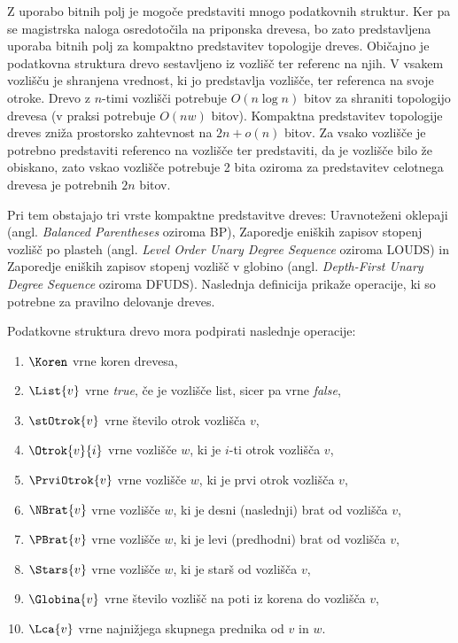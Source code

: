 Z uporabo bitnih polj je mogoče predstaviti mnogo podatkovnih struktur. Ker pa se magistrska naloga osredotočila na priponska drevesa, bo zato predstavljena uporaba bitnih polj za kompaktno predstavitev topologije dreves. Običajno je podatkovna struktura drevo sestavljeno iz vozlišč ter referenc  na njih. V vsakem vozlišču je shranjena vrednost, ki jo predstavlja vozlišče, ter referenca na svoje otroke. Drevo z $n$-timi vozlišči potrebuje $O(n\log{n})$ bitov za shraniti topologijo drevesa (v praksi potrebuje $O(nw)$ bitov). Kompaktna predstavitev topologije dreves zniža prostorsko zahtevnost na $2n+o(n)$ bitov. Za vsako vozlišče je potrebno predstaviti referenco na vozlišče ter predstaviti, da je vozlišče bilo že obiskano, zato vskao vozlišče potrebuje 2 bita oziroma za predstavitev celotnega drevesa je potrebnih $2n$ bitov.

Pri tem obstajajo tri vrste kompaktne predstavitve dreves: Uravnoteženi oklepaji (angl. \textit{Balanced Parentheses} oziroma BP), Zaporedje eniških zapisov stopenj vozlišč po plasteh (angl. \textit{Level Order Unary Degree Sequence} oziroma LOUDS) in Zaporedje eniških zapisov stopenj vozlišč v globino (angl. \textit{Depth-First Unary Degree Sequence} oziroma DFUDS). Naslednja definicija prikaže operacije, ki so potrebne za pravilno delovanje dreves.


\begin{defi}\label{def:drevo}
    Podatkovne struktura drevo mora podpirati naslednje operacije:
    \begin{enumerate}
        \item $\Koren$ vrne koren drevesa,
        \item $\List{v}$ vrne \textit{true}, če je vozlišče list, sicer pa vrne \textit{false},
        \item $\stOtrok{v}$ vrne število otrok vozlišča $v$,
        \item $\Otrok{v}{i}$ vrne vozlišče $w$, ki je $i$-ti otrok vozlišča $v$,
        \item $\PrviOtrok{v}$ vrne vozlišče $w$, ki je prvi otrok vozlišča $v$,
        \item $\NBrat{v}$ vrne vozlišče $w$, ki je desni (naslednji) brat od vozlišča $v$,
        \item $\PBrat{v}$ vrne vozlišče $w$, ki je levi (predhodni) brat od vozlišča $v$,
        \item $\Stars{v}$ vrne vozlišče $w$, ki je starš od vozlišča $v$,
        \item $\Globina{v}$ vrne število vozlišč na poti iz korena do vozlišča $v$, %
        \item $\Lca{v}$ vrne najnižjega skupnega prednika od $v$ in $w$.
    \end{enumerate}
\end{defi}


